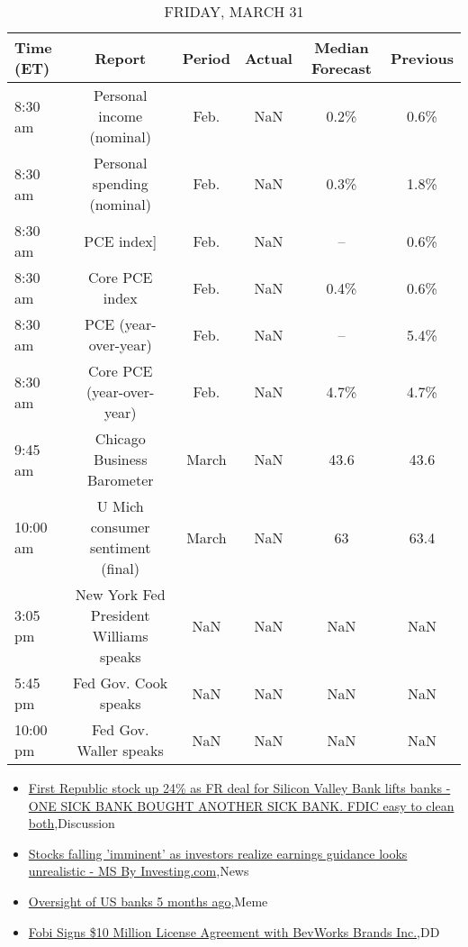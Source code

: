 \documentclass{article}%
\begin{document}
\begin{table}[htbp]%
\caption{FRIDAY, MARCH 31}%
\centering%
\begin{adjustbox}{width=1\textwidth}%
\begin{tabular}{lccccc}
\toprule
Time (ET) &                                 Report & Period & Actual & Median Forecast & Previous \\
\midrule
  8:30 am &              Personal income (nominal) &   Feb. &    NaN &            0.2\% &     0.6\% \\
  8:30 am &            Personal spending (nominal) &   Feb. &    NaN &            0.3\% &     1.8\% \\
  8:30 am &                             PCE index] &   Feb. &    NaN &              -- &     0.6\% \\
  8:30 am &                         Core PCE index &   Feb. &    NaN &            0.4\% &     0.6\% \\
  8:30 am &                   PCE (year-over-year) &   Feb. &    NaN &              -- &     5.4\% \\
  8:30 am &              Core PCE (year-over-year) &   Feb. &    NaN &            4.7\% &     4.7\% \\
  9:45 am &             Chicago Business Barometer &  March &    NaN &            43.6 &     43.6 \\
 10:00 am &      U Mich consumer sentiment (final) &  March &    NaN &              63 &     63.4 \\
  3:05 pm & New York Fed President Williams speaks &    NaN &    NaN &             NaN &      NaN \\
  5:45 pm &                   Fed Gov. Cook speaks &    NaN &    NaN &             NaN &      NaN \\
 10:00 pm &                 Fed Gov. Waller speaks &    NaN &    NaN &             NaN &      NaN \\
\bottomrule
\end{tabular}
%
\end{adjustbox}%
\end{table}

%
\begin{itemize}%
\item%
\href{https://reddit.com/r/wallstreetbets/comments/123lsfj/first\_republic\_stock\_up\_24\_as\_fr\_deal\_for\_silicon/}{First Republic stock up 24\% as FR deal for Silicon Valley Bank lifts banks - ONE SICK BANK BOUGHT ANOTHER SICK BANK. FDIC easy to clean both},Discussion%
\item%
\href{https://reddit.com/r/wallstreetbets/comments/123kegl/stocks\_falling\_imminent\_as\_investors\_realize/}{Stocks falling 'imminent' as investors realize earnings guidance looks unrealistic - MS By Investing.com},News%
\item%
\href{https://reddit.com/r/wallstreetbets/comments/123j80d/oversight\_of\_us\_banks\_5\_months\_ago/}{Oversight of US banks 5 months ago},Meme%
\item%
\href{https://reddit.com/r/Baystreetbets/comments/123nia8/fobi\_signs\_10\_million\_license\_agreement\_with/}{Fobi Signs \$10 Million License Agreement with BevWorks Brands Inc.},DD%
\end{itemize}%
\end{document}
